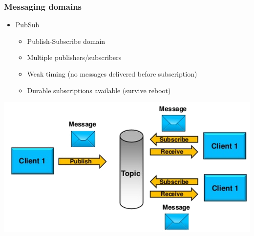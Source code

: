 \documentclass[10pt,xcolor=pdflatex]{beamer}
\begin{document}
\begin{frame}[containsverbatim]\frametitle{Messaging domains}
\begin{itemize}
	\item PubSub
      \begin{itemize}
    	\item Publish-Subscribe domain
		\item Multiple publishers/subscribers
		\item Weak timing (no messages delivered before subscription)
		\item Durable subscriptions available (survive reboot)
      \end{itemize}
\end{itemize}
\begin{center}
\includegraphics[scale=0.5]{img/obr3_2}
\end{center}
\end{frame}
\end{document}

